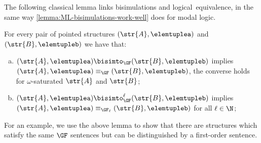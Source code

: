 The following classical lemma links bisimulations and logical~equivalence, in the same way \cref{lemma:ML-bisimulations-work-well} does for modal logic.
\begin{lemma}\label{lemma:GF-bisimulations-work-well}
For every pair of pointed structures $(\str{A}, \elemtuplea)$ and~$(\str{B}, \elemtupleb)$ we have that:
\begin{enumerate}[(a)]
\item $(\str{A}, \elemtuplea) \bisimto_{\GF} (\str{B}, \elemtupleb)$ implies $(\str{A}, \elemtuplea) \equiv_{\GF} (\str{B}, \elemtupleb)$, the converse holds for $\omega$-saturated $\str{A}$ and $\str{B}$;
\item $(\str{A}, \elemtuplea) \bisimto_{\GF}^{\ell} (\str{B}, \elemtupleb)$ implies $(\str{A}, \elemtuplea) \equiv_{\GF_\ell} (\str{B}, \elemtupleb)$ for all $\ell \in \N$;
\end{enumerate}
\end{lemma}
For an example, we use the above lemma to show that there are structures which satisfy the same $\GF$ sentences but can be distinguished by a first-order sentence.
